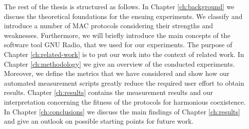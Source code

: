 The rest of the thesis is structured as follows. In Chapter \ref{ch:background} we discuss the theoretical foundations for the ensuing experiments. We classify and introduce a number of MAC protocols considering their strengths and weaknesses. Furthermore, we will briefly introduce the main concepts of the software tool GNU Radio, that we used for our experiments. The purpose of Chapter \ref{ch:related-work} is to put our work into the context of related work.
In Chapter \ref{ch:methodology} we give an overview of the conducted experiments. Moreover, we define the metrics that we have considered and show how our automated measurement scripts greatly reduce the required user effort to obtain results.
Chapter \ref{ch:results} contains the measurement results and our interpretation concerning the fitness of the protocols for harmonious coexistence. 
In Chapter \ref{ch:conclusions} we discuss the main findings of Chapter \ref{ch:results} and give an outlook on possible starting points for future work.